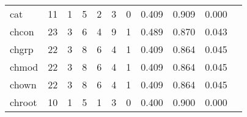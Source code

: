 \begin{longtable}{lp{1.20cm}p{1.20cm}p{1.20cm}p{1.20cm}p{1.20cm}p{1.20cm}p{1.20cm}p{1.20cm}p{1.20cm}p{1.20cm}}
cat       &                                    11 &                                                  1 &                                                  5 &                                                  2 &                                                  3 &                                                  0 &                                         0.409 &                                              0.909 &                                              0.000 \\
chcon     &                                    23 &                                                  3 &                                                  6 &                                                  4 &                                                  9 &                                                  1 &                                         0.489 &                                              0.870 &                                              0.043 \\
chgrp     &                                    22 &                                                  3 &                                                  8 &                                                  6 &                                                  4 &                                                  1 &                                         0.409 &                                              0.864 &                                              0.045 \\
chmod     &                                    22 &                                                  3 &                                                  8 &                                                  6 &                                                  4 &                                                  1 &                                         0.409 &                                              0.864 &                                              0.045 \\
chown     &                                    22 &                                                  3 &                                                  8 &                                                  6 &                                                  4 &                                                  1 &                                         0.409 &                                              0.864 &                                              0.045 \\
chroot    &                                    10 &                                                  1 &                                                  5 &                                                  1 &                                                  3 &                                                  0 &                                         0.400 &                                              0.900 &                                              0.000 \\

\end{longtable}
